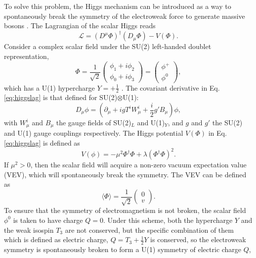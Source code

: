 \documentclass[a4paper,12pt]{article}
\begin{document}
To solve this problem, the Higgs mechanism can be introduced as a way to spontaneously break the symmetry of the electroweak force to generate massive bosons \cite{higgs}.
The Lagrangian of the scalar Higgs reads
\begin{equation}
    \label{eq:higgslag}
    \mathcal{L} = (D^\mu\Phi)^\dagger(D_\mu\Phi) - V(\Phi).
\end{equation}
Consider a complex scalar field under the SU(2) left-handed doublet representation,
\begin{equation}
    \label{eq:doubscal}
    \Phi = \frac{1}{\sqrt{2}}\begin{pmatrix}\phi_1+i\phi_2\\\phi_0+i\phi_3\end{pmatrix} = \begin{pmatrix} \phi^+\\\phi^0\end{pmatrix},
\end{equation}
which has a U(1) hypercharge $Y=+\frac12$ \cite{higgs}.
The covariant derivative in Eq.\eqref{eq:higgslag} is that defined for SU(2)$\otimes$U(1):
\begin{equation}
    \label{eq:covarhiggs}
    D_\mu\phi = \left(\partial_\mu + igT^iW_\mu^i + \frac{i}{2}g'B_\mu\right)\phi,
\end{equation}
with $W^i_\mu$ and $B_\mu$ the gauge fields of SU(2)$_L$ and U(1)$_Y$, and $g$ and $g'$ the SU(2) and U(1) gauge couplings respectively. 
The Higgs potential $V(\Phi)$ in Eq.\eqref{eq:higgslag} is defined as
\begin{equation}
    \label{eq:goldpot}
    V(\phi) = -\mu^2\Phi^\dagger\Phi + \lambda(\Phi^\dagger\Phi)^2.
\end{equation}
If $\mu^2>0$, then the scalar field will acquire a non-zero vacuum expectation value (VEV), which will spontaneously break the symmetry. 
The VEV can be defined as
\begin{equation}
    \label{eq:vev}
    \langle\Phi\rangle = \frac{1}{\sqrt{2}}\begin{pmatrix}0\\v\end{pmatrix}.
\end{equation}
To ensure that the symmetry of electromagnetism is not broken, the scalar field $\phi^0$ is taken to have charge $Q=0$.
Under this scheme, both the hypercharge $Y$ and the weak isospin $T_3$ are not conserved, but the specific combination of them which is defined as electric charge, $Q=T_3+\frac12 Y$ is conserved, so the electroweak symmetry is spontaneously broken to form a U(1) symmetry of electric charge $Q$,
\end{document}
